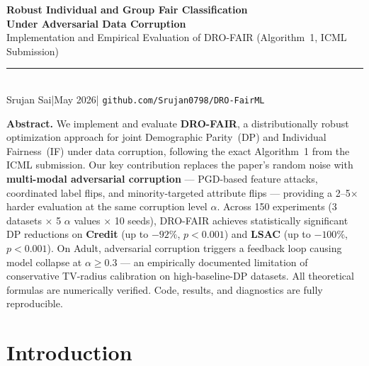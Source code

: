 \documentclass[11pt,a4paper]{article}
\begin{document}
\begin{center}
  \vspace*{0.6cm}
  {\LARGE\bfseries\color{hdrblue}
    Robust Individual and Group Fair Classification\\[0.3em]
    Under Adversarial Data Corruption}\\[0.7em]
  {\large Implementation and Empirical Evaluation of DRO-FAIR (Algorithm~1, ICML Submission)}\\[0.4em]
  \textcolor{gray}{\rule{0.6\textwidth}{0.6pt}}\\[0.3em]
  {\normalsize Srujan Sai\quad|\quad May 2026\quad|\quad
    \texttt{github.com/Srujan0798/DRO-FairML}}
  \vspace{0.3cm}
\end{center}

\begin{mdframed}[backgroundcolor=noteblue,linecolor=hdrblue,linewidth=1pt,
                 innertopmargin=10pt,innerbottommargin=10pt]
\textbf{\color{hdrblue}Abstract.}\quad
We implement and evaluate \textbf{DRO-FAIR}, a distributionally robust
optimization approach for joint Demographic Parity~(DP) and Individual
Fairness~(IF) under data corruption, following the exact Algorithm~1 from
the ICML submission.  Our key contribution replaces the paper's random noise
with \textbf{multi-modal adversarial corruption} --- PGD-based feature attacks,
coordinated label flips, and minority-targeted attribute flips ---
providing a 2--5$\times$ harder evaluation at the same corruption level $\alpha$.
Across 150 experiments (3 datasets $\times$ 5 $\alpha$ values $\times$ 10
seeds), DRO-FAIR achieves statistically significant DP reductions on
\textbf{Credit} (up to $-92\%$, $p{<}0.001$) and \textbf{LSAC}
(up to $-100\%$, $p{<}0.001$).
On Adult, adversarial corruption triggers a feedback loop causing model
collapse at $\alpha{\geq}0.3$ --- an empirically documented limitation of
conservative TV-radius calibration on high-baseline-DP datasets.
All theoretical formulas are numerically verified.
Code, results, and diagnostics are fully reproducible.
\end{mdframed}

\tableofcontents
\vspace{0.5cm}

\section{Introduction}
\end{document}
